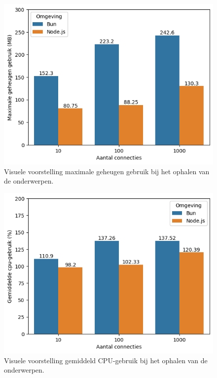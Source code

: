   \begin{figure}[H]
    \centering
    \includegraphics{graphics/GetMySqlRAM.png}
    \caption{\label{fig:getgeheugenmysql}Visuele voorstelling maximale geheugen gebruik bij het ophalen van de onderwerpen.}
  \end{figure}
  \begin{figure}[H]
    \centering
    \includegraphics{graphics/GetMySqlCpu.png}
    \caption{\label{fig:getcpumysql}Visuele voorstelling gemiddeld CPU-gebruik bij het ophalen van de onderwerpen.}
  \end{figure}

